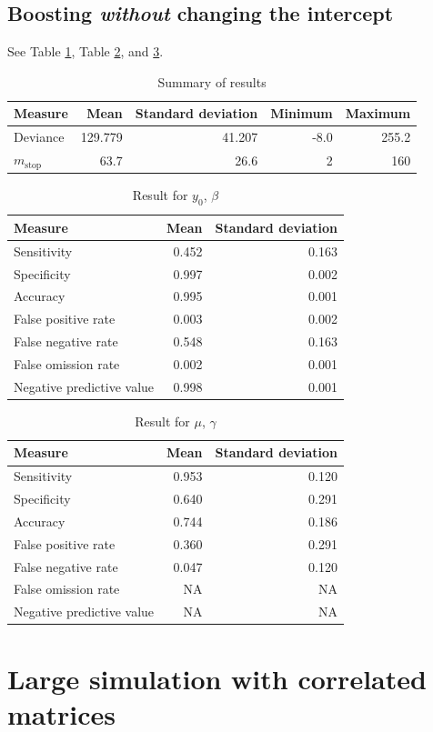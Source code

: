 \subsection{Boosting \textit{without} changing the intercept}
See Table \ref{table:non-correlated-no-intercept-summary}, Table \ref{table:non-correlated-no-intercept-y0}, and \ref{table:non-correlated-no-intercept-mu}.
\begin{table}\caption{Summary of results}\label{table:non-correlated-no-intercept-summary}
\begin{tabular}{l|rrrr}
Measure &    Mean &     Standard deviation &  Minimum & Maximum \\
\hline
Deviance & 129.779 & 41.207 & -8.0 & 255.2 \\
$m_{\text{stop}}$   &  63.7 & 26.6 &  2 & 160 \\
\end{tabular}
\end{table}

\begin{table}\caption{Result for $y_0$, $\beta$}\label{table:non-correlated-no-intercept-y0}
\begin{tabular}{l|rr}
Measure &  Mean &    Standard deviation \\
\hline
Sensitivity & 0.452 & 0.163 \\
Specificity & 0.997 & 0.002 \\
Accuracy    & 0.995 & 0.001 \\
False positive rate         & 0.003 & 0.002 \\
False negative rate         & 0.548 & 0.163 \\
False omission rate         & 0.002 & 0.001 \\
Negative predictive value         & 0.998 & 0.001
\end{tabular}
\end{table}


\begin{table}\caption{Result for $\mu$, $\gamma$}\label{table:non-correlated-no-intercept-mu}
\begin{tabular}{l|rr}
Measure &  Mean & Standard deviation \\
\hline
Sensitivity & 0.953 & 0.120 \\
Specificity & 0.640 & 0.291 \\
Accuracy    & 0.744 & 0.186 \\
False positive rate         & 0.360 & 0.291 \\
False negative rate         & 0.047 & 0.120 \\
False omission rate         &    NA &    NA \\
Negative predictive value         &    NA &    NA \\
\end{tabular}
\end{table}


\section{Large simulation with correlated matrices}